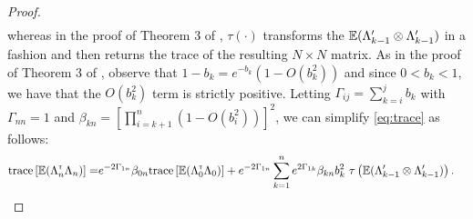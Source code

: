 \begin{proof}
\begin{align}
 \end{align}
whereas in the proof of Theorem 3 of \cite{spall-jacobian}, $\tau(\cdot)$ transforms the $\mathbb{E} (\Lambda_{k-1}' \otimes \Lambda_{k-1}')$ in a  fashion and then returns the trace of the resulting $N\times N$ matrix.
As in the proof of Theorem 3 of \cite{spall-jacobian}, observe that $1-b_k = e^{-b_k}(1-O(b_k^2))$ and since $0 < b_k <1$, we have that the $O(b_k^2)$ term is strictly positive. 
Letting $\Gamma_{ij} = \sum_{k=i}^j b_k$ with $\Gamma_{nn} = 1$ and $\beta_{kn} = \left[\prod_{i=k+1}^n (1- O(b_i^2))\right]^2$, we can simplify \eqref{eq:trace} as follows:
\begin{align}\label{eq:wij}
 \text{trace} \left[\mathbb{E} (\Lambda_n ^\mathsf{\scriptscriptstyle T} \Lambda_n)\right] = &e^{-2 \Gamma_{1n}} \beta_{0n} \text{trace} \left[\mathbb{E} (\Lambda_0 ^\mathsf{\scriptscriptstyle T} \Lambda_0)\right]  + e^{-2 \Gamma_{1n}} \sum_{k=1}^n e^{2 \Gamma_{1k}} \beta_{kn} b_k^2  \,\,\tau\left(\mathbb{E} (\Lambda_{k-1}' \otimes \Lambda_{k-1}')\right).
 \end{align} 

\end{proof}
